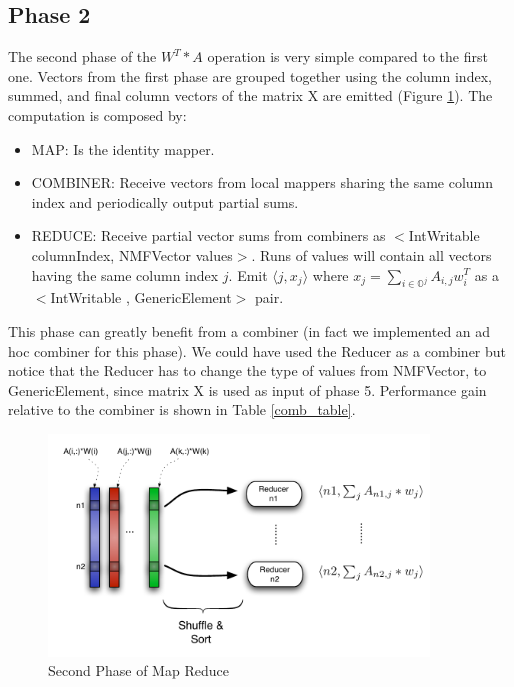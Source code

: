 \documentclass[a4paper,12pt]{article}
\newcommand{\javalisting}[2]{
	
}
\begin{document}

\subsection{Phase 2}
\label{sec:phase2}

The second phase of the $W^T*A$ operation is very simple compared to the first one.
Vectors from the first phase are grouped together using the column index, summed, and final column vectors of the matrix X are emitted (Figure \ref{fig:Map2}).
The computation is composed by:
\begin{itemize}
          \item MAP: Is the identity mapper.
			\item COMBINER: Receive vectors from local mappers sharing the same column index and periodically output partial sums.
          \item REDUCE: Receive partial vector sums from combiners as $<$IntWritable columnIndex, NMFVector values$>$. 
          Runs of values will contain all vectors having the same column index $j$. 
          Emit $\langle j, x_j \rangle$ where $ x_j = \sum_{i \in \mathbb{O}^j} A_{i,j}  w_{i}^{T} $ as a $<$IntWritable , GenericElement$>$ pair.
\end{itemize}
This phase can greatly benefit from a combiner (in fact we implemented an ad hoc combiner for this phase).
We could have used the Reducer as a combiner but notice that the Reducer has to change the type of values from NMFVector, to GenericElement, since matrix X is used as input of phase 5.
Performance gain relative to the combiner is shown in Table \ref{comb_table}.

\begin{center}
	\begin{figure}[h]
	\centering
	\includegraphics[width=0.9\textwidth]{./figures/Map2}
	\caption{Second Phase of Map Reduce}
	\label{fig:Map2}
	\end{figure}
\end{center}
\end{document}
